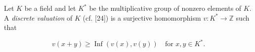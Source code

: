 Let $K$ be a field and let $K^*$ be the multiplicative group of nonzero elements of $K$. A \emph{discrete valuation} of $K$ (cf. [24]) is a surjective homomorphism $v: K^* \to \mathbb{Z}$ such that

$$v(x + y) \geq \operatorname{Inf}(v(x), v(y)) \quad \text{for } x, y \in K^*.$$
